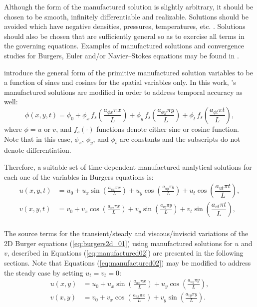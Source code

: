 \documentclass[10pt]{article}
\begin{document}
Although the form of the manufactured solution is slightly arbitrary, it should be chosen to be smooth, infinitely differentiable and realizable. Solutions should be avoided which have negative densities, pressures, temperatures, etc. \citep{Salari_Knupp_2000,Roy2004}. Solutions should also be chosen that are sufficiently general so as to exercise all terms in the governing equations. Examples of manufactured solutions and convergence studies for Burgers, Euler and/or Navier--Stokes equations may be found in \citet{Salari_Knupp_2000,Roy2002,Roy2004,Bond2007,Orozco2010}.

\citet{Roy2002} introduce the general form of the primitive manufactured solution variables to be  a function of sines and cosines for the spatial variables only. In this work, \citet{Roy2002}'s manufactured solutions are modified in order to address temporal accuracy as well:
\begin{equation*}
 \label{eq:manufactured01}
  \phi (x,y,t) = \phi_0+ \phi_x\, f_s \left(\frac{a_{\phi x} \pi x}{L} \right) +  \phi_y \,f_s\left(\frac{a_{\phi y} \pi y}{L}\right) +  \phi_t \,f_s\left(\frac{a_{\phi t} \pi t}{L}\right),
\end{equation*}
where $\phi=u$ or $v$, and $f_s(\cdot)$ functions denote either sine or cosine function. Note that in this case, $\phi_x$, $\phi_y$,  and $\phi_t$ are constants  and the subscripts do not denote differentiation.

Therefore, a suitable set of time-dependent manufactured analytical solutions for  each one of the variables in Burgers equations is:
\begin{equation}
\begin{split}
\label{eq:manufactured02}
u\left(x,y,t\right) &= u_{0}+u_{x} \sin\left(\frac{a_{u x} \pi x}{L}\right)+u_{y} \cos\left(\frac{a_{u y} \pi y}{L}\right) + u_t \cos\left(\dfrac{a_{u t} \pi t}{L}\right),\\
v\left(x,y,t\right) &= v_{0}+v_{x} \cos\left(\frac{a_{v x} \pi x}{L}\right)+v_{y} \sin\left(\frac{a_{v y} \pi y}{L}\right)+ v_t \sin\left(\dfrac{a_{v t} \pi t}{L}\right),\\
\end{split}
\end{equation}



The source terms for the transient/steady and viscous/inviscid variations of the 2D Burger equations (\ref{eq:burgers2d_01}) using manufactured solutions  for $u$ and $v$, described in Equations (\ref{eq:manufactured02}) are presented in the following sections. Note that Equations (\ref{eq:manufactured02}) may be modified to address the steady case by setting $u_t=v_t=0$:
\begin{equation}
\begin{split}
\label{eq:manufactured03}
u\left(x,y\right) &= u_{0}+u_{x} \sin\left(\frac{a_{u x} \pi x}{L}\right)+u_{y} \cos\left(\frac{a_{u y} \pi y}{L}\right) ,\\
v\left(x,y\right) &= v_{0}+v_{x} \cos\left(\frac{a_{v x} \pi x}{L}\right)+v_{y} \sin\left(\frac{a_{v y} \pi y}{L}\right).
\end{split}
\end{equation}
\end{document}
